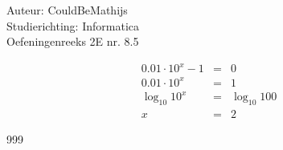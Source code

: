 \documentclass[a4paper]{article}
\begin{document}
  
\noindent \large Auteur: CouldBeMathijs \\
\noindent \large Studierichting: Informatica\\
\noindent \large Oefeningenreeks 2E nr. 8.5\\

\medskip

\normalsize

\begin{eqnarray*}
    0.01 \cdot 10^x - 1 &=& 0\\
    0.01 \cdot 10^x &=& 1\\
    \log_{10} 10^x &=& \log_{10} 100\\
    x &=& 2
\end{eqnarray*}


\begin{thebibliography}{999}
\end{thebibliography}
\end{document}
